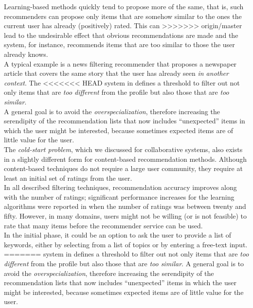 Learning-based methods quickly tend to propose more of the same, that
is, such recommenders can propose only items that are somehow similar
to the ones the current user has already (positively) rated. This can
>>>>>>> origin/master
lead to the undesirable effect that obvious recommendations are made
and the system, for instance, recommends items that are too similar to
those the user already knows.\\ A typical example is a news filtering
recommender that proposes a newspaper article that covers the same
story that the user has already seen \textit{in another context}. The
<<<<<<< HEAD
system in  \cite{billsus1999personal}  defines a threshold to filter
out not only items that are \textit{too different} from the profile
but also those that are \textit{too similar}. \\A general goal is to
avoid the \textit{overspecialization}, therefore increasing the
serendipity of the recommendation lists that now includes “unexpected”
items in which the user might be interested, because sometimes
expected items are of little value for the user.\\ 
The  \textit{cold-start problem}, 
which we discussed for collaborative systems,  also
exists in a slightly different form for content-based recommendation
methods. Although content-based techniques do not require a large user
community, they require at least an initial set of ratings from the
user. \\ In all described filtering techniques, recommendation
accuracy improves along with the number of ratings; significant
performance increases for the learning algorithms were reported in
 \cite{pazzani1997learning}   when the number of ratings was between
twenty and fifty. However, in many domains, users might not be
willing (or is not feasible) to rate that many items before the
recommender  service can be used. \\In the initial phase, it could be an
option to ask  the user to provide a list of keywords, either by
selecting from a  list of topics or by entering a free-text input.
=======
system in \cite{billsus1999personal}  defines a threshold to filter
out not only items that are \textit{too different} from the profile
but also those that are \textit{too similar}. A general goal is to
avoid the \textit{overspecialization}, therefore increasing the
serendipity of the recommendation lists that now includes “unexpected”
items in which the user might be interested, because sometimes
expected items are of little value for the user.\\
